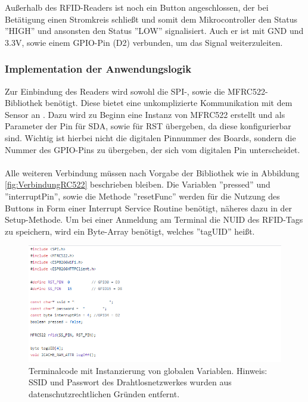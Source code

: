 \documentclass[12pt,titlepage]{scrartcl}
\begin{document}
			\noindent Außerhalb des RFID-Readers ist noch ein Button angeschlossen, der bei Betätigung einen Stromkreis schließt und somit dem Mikrocontroller den Status ''HIGH'' und ansonsten den Status ''LOW'' signalisiert. Auch er ist mit GND und 3.3V, sowie einem GPIO-Pin (D2) verbunden, um das Signal weiterzuleiten.
			\subsubsection{Implementation der Anwendungslogik} \label{logicTerminal}
			Zur Einbindung des Readers wird sowohl die SPI-, sowie die MFRC522-Bibliothek benötigt. Diese bietet eine unkomplizierte Kommunikation mit dem Sensor an \cite{mfrc522git}. Dazu wird zu Beginn eine Instanz von MFRC522 erstellt und als Parameter der Pin für SDA, sowie für RST übergeben, da diese konfigurierbar sind. Wichtig ist hierbei nicht die digitalen Pinnummer des Boards, sondern die Nummer des GPIO-Pins zu übergeben, der sich vom digitalen Pin unterscheidet. \\ \\
			Alle weiteren Verbindung müssen nach Vorgabe der Bibliothek wie in Abbildung \ref{fig:VerbindungRC522} beschrieben bleiben. Die Variablen ''pressed'' und ''interruptPin'', sowie die Methode ''resetFunc'' werden für die Nutzung des Buttons in Form einer Interrupt Service Routine benötigt, näheres dazu in der Setup-Methode. Um bei einer Anmeldung am Terminal die NUID des RFID-Tags zu speichern, wird ein Byte-Array benötigt, welches ''tagUID'' heißt.\\
		\begin{figure}[H] 
  			\centering
    		\includegraphics[height=0.25\textheight]{terminalHead}
  			\caption{Terminalcode mit Instanzierung von globalen Variablen. Hinweis: SSID und Passwort des Drahtlosnetzwerkes wurden aus datenschutzrechtlichen Gründen entfernt.}
  			\label{fig:terminalHead}
		\end{figure}
\end{document}
